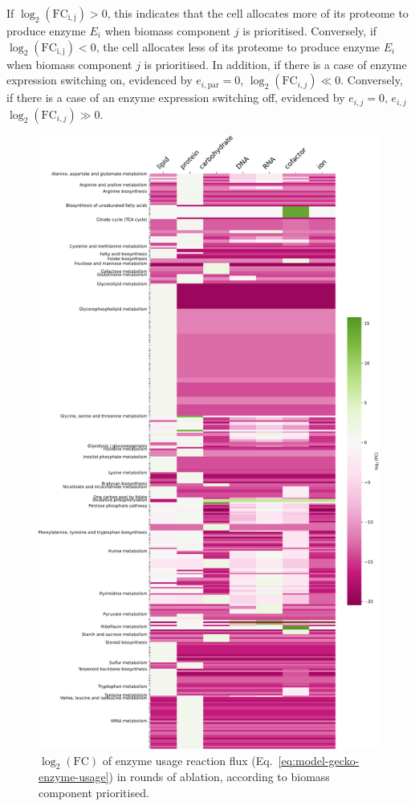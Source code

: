If $\log_{2}(\mathrm{FC_{i,j}}) > 0$, this indicates that the cell allocates more of its proteome to produce enzyme $E_{i}$ when biomass component $j$ is prioritised.
Conversely, if $\log_{2}(\mathrm{FC_{i,j}}) < 0$, the cell allocates less of its proteome to produce enzyme $E_{i}$ when biomass component $j$ is prioritised.
In addition, if there is a case of enzyme expression switching on, evidenced by $e_{i, \mathrm{par}} = 0$, $\log_{2}(\mathrm{FC}_{i,j}) \ll 0$.
Conversely, if there is a case of an enzyme expression switching off, evidenced by $e_{i, j} = 0$, $e_{i,j}$ $\log_{2}(\mathrm{FC}_{i,j}) \gg 0$.

\begin{figure}
  \centering
  \includegraphics[width=.8\linewidth]{allocation_fc}
  \caption{
    $\log_{2}(\mathrm{FC})$ of enzyme usage reaction flux (Eq.\ \ref{eq:model-gecko-enzyme-usage}) in rounds of ablation, according to biomass component prioritised.
}
\end{figure}
